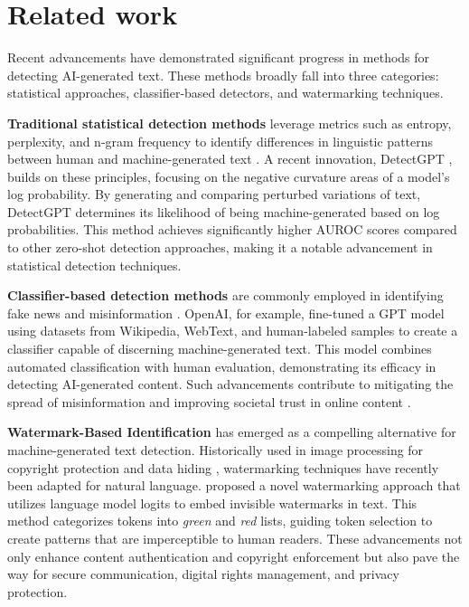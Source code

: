 \section{Related work}
Recent advancements have demonstrated significant progress in methods for detecting AI-generated text. These methods broadly fall into three categories: statistical approaches, classifier-based detectors, and watermarking techniques.

\textbf{Traditional statistical detection methods} leverage metrics such as entropy, perplexity, and n-gram frequency to identify differences in linguistic patterns between human and machine-generated text \cite{Lavergne2008DetectingFC,Gehrmann2019GLTRSD}. A recent innovation, DetectGPT \cite{mitchell2023detectgptzeroshotmachinegeneratedtext}, builds on these principles, focusing on the negative curvature areas of a model's log probability. By generating and comparing perturbed variations of text, DetectGPT determines its likelihood of being machine-generated based on log probabilities. This method achieves significantly higher AUROC scores compared to other zero-shot detection approaches, making it a notable advancement in statistical detection techniques.

\textbf{Classifier-based detection methods} are commonly employed in identifying fake news and misinformation \cite{schildhauer2022fake,zou2021ai}. OpenAI, for example, fine-tuned a GPT model using datasets from Wikipedia, WebText, and human-labeled samples to create a classifier capable of discerning machine-generated text. This model combines automated classification with human evaluation, demonstrating its efficacy in detecting AI-generated content. Such advancements contribute to mitigating the spread of misinformation and improving societal trust in online content \cite{kshetri2022deep}.

\textbf{Watermark-Based Identification} has emerged as a compelling alternative for machine-generated text detection. Historically used in image processing for copyright protection and data hiding \cite{langelaar2000watermarking,wmark_old1}, watermarking techniques have recently been adapted for natural language. \cite{kirchenbauer2023watermark} proposed a novel watermarking approach that utilizes language model logits to embed invisible watermarks in text. This method categorizes tokens into \textit{green} and \textit{red} lists, guiding token selection to create patterns that are imperceptible to human readers. These advancements not only enhance content authentication and copyright enforcement but also pave the way for secure communication, digital rights management, and privacy protection.

